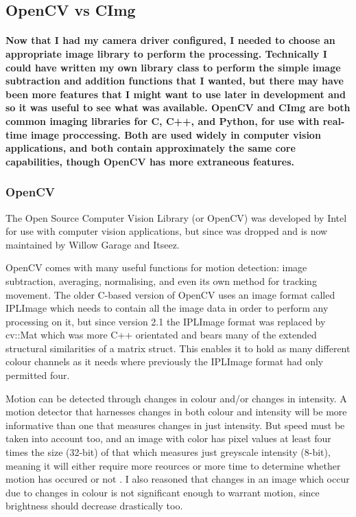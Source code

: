 \subsection{OpenCV vs CImg}
\paragraph{Now that I had my camera driver configured, I needed to choose an appropriate image library to perform the processing. Technically I could have written my own library class to perform the simple image subtraction and addition functions that I wanted, but there may have been more features that I might want to use later in development and so it was useful to see what was available. OpenCV and CImg are both common imaging libraries for C, C++, and Python, for use with real-time image proccessing.  Both are used widely in computer vision applications, and both contain approximately the same core capabilities, though OpenCV has more extraneous features.}
\subsubsection{OpenCV}
The Open Source Computer Vision Library (or OpenCV) was developed by Intel for use with computer vision applications, but since was dropped and is now maintained by Willow Garage and Itseez.

OpenCV comes with many useful functions for motion detection: image subtraction, averaging, normalising, and even its own method for tracking movement. The older C-based version of OpenCV uses an image format called IPLImage which needs to contain all the image data in order to perform any processing on it, but since version 2.1 the IPLImage format was replaced by cv::Mat which was more C++ orientated and bears many of the extended structural similarities of a matrix struct. This enables it to hold as many different colour channels as it needs where previously the IPLImage format had only permitted four.

Motion can be detected through changes in colour and/or changes in intensity. A motion detector that harnesses changes in both colour and intensity will be more informative than one that measures changes in just intensity. But speed must be taken into account too, and an image with color has pixel values at least four times the size (32-bit) of that which measures just greyscale intensity (8-bit), meaning it will either require more reources or more time to determine whether motion has occured or not . I also reasoned that changes in an image which occur due to changes in colour is not significant enough to warrant motion, since brightness should decrease drastically too.

